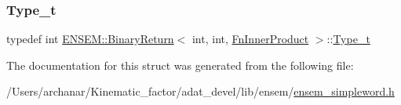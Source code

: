 \mbox{\label{structENSEM_1_1BinaryReturn_3_01int_00_01int_00_01FnInnerProduct_01_4_a702d8c8623acf6a0b21fd2fc27b4fa44}} 
\subsubsection{\texorpdfstring{Type\_t}{Type\_t}\hspace{0.1cm}{\footnotesize\ttfamily [2/2]}}
{\footnotesize\ttfamily typedef int \mbox{\hyperlink{structENSEM_1_1BinaryReturn}{E\+N\+S\+E\+M\+::\+Binary\+Return}}$<$ int, int, \mbox{\hyperlink{structENSEM_1_1FnInnerProduct}{Fn\+Inner\+Product}} $>$\+::\mbox{\hyperlink{structENSEM_1_1BinaryReturn_3_01int_00_01int_00_01FnInnerProduct_01_4_a702d8c8623acf6a0b21fd2fc27b4fa44}{Type\+\_\+t}}}



The documentation for this struct was generated from the following file\+:\begin{DoxyCompactItemize}
\item 
/\+Users/archanar/\+Kinematic\+\_\+factor/adat\+\_\+devel/lib/ensem/\mbox{\hyperlink{lib_2ensem_2ensem__simpleword_8h}{ensem\+\_\+simpleword.\+h}}\end{DoxyCompactItemize}
